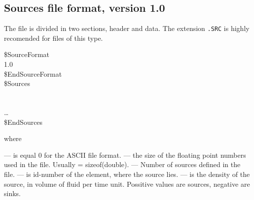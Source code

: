 %
%
%
%

\subsection{Sources file format, version 1.0}
The file is divided in two sections, header and data.
The extension {\tt .SRC} is highly recomended for files of this type.
\begin{fileformat}
\$SourceFormat\\
  1.0  \\
\$EndSourceFormat\\
\$Sources\\
  \\
   \\
  \dots\\
\$EndSources\\
\end{fileformat}
where
\begin{description}
  --- is equal 0 for the ASCII file format.
  --- the size of the floating point numbers used in
  the file. Usually  = sizeof(double).
  --- Number of sources defined in the
  file.
  --- is id-number of the element, where the source lies.
  --- is the density of the source, in volume of fluid
   per time unit. Possitive values are sources, negative are sinks.
\end{description}
